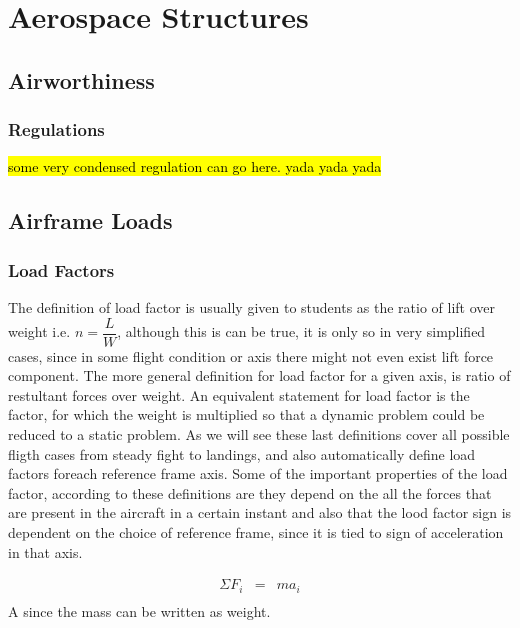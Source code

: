 \chapter{Aerospace Structures}

\newpage
\section{Airworthiness}


\subsection{Regulations}
\hl{some very condensed regulation can go here. yada yada yada}





\newpage
\section{Airframe Loads}



\subsection{Load Factors}
The definition of load factor is usually given to students as the ratio of lift over weight i.e. $n= \dfrac{L}{W}$, although this is can be true,
it is only so in very simplified cases, since in some flight condition or axis there might not even exist lift force component.
The more general definition for load factor for a given axis, is ratio of restultant forces over weight.
An equivalent statement for load factor is the factor, for which the weight is multiplied so that a dynamic problem could be reduced to a static problem.
As we will see these last definitions cover all possible fligth cases from steady fight to landings, and also automatically define load factors
foreach reference frame axis.
Some of the important properties of the load factor, according to these definitions are they depend on the all the forces that are present
in the aircraft in a certain instant and also that the lood factor sign is dependent on the choice of reference frame, since it is tied to
sign of acceleration in that axis.

\begin{eqnarray}
\Sigma F_i &=& m a_i \\
\end{eqnarray}
A since the mass can be written as weight.

